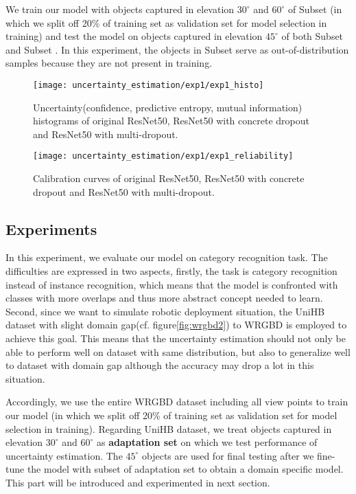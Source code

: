 We train our model with objects captured in elevation $30^\circ$ and $60^\circ$ of Subset  (in which we split off 20\% of training set as validation set for model selection in training) and test the model on objects captured in elevation $45^\circ$ of both Subset  and Subset . In this experiment, the objects in Subset  serve as out-of-distribution samples because they are not present in training.


\begin{figure}[H]
	\begin{center}
		\texttt{[image: uncertainty\_estimation/exp1/exp1\_histo]}
		\caption{Uncertainty(confidence, predictive entropy, mutual information) histograms of original ResNet50, ResNet50 with concrete dropout and ResNet50 with multi-dropout.}		
		\label{exp1_histo}
	\end{center}
\end{figure}
\begin{figure}[H]
	\begin{center}
		\texttt{[image: uncertainty\_estimation/exp1/exp1\_reliability]}
		\caption{Calibration curves of original ResNet50, ResNet50 with concrete dropout and ResNet50 with multi-dropout.}		
		\label{exp1_reliability}
	\end{center}
\end{figure}

\subsection{Experiments }
In this experiment, we evaluate our model on category recognition task. The difficulties are expressed in two aspects, firstly, the task is category recognition instead of instance recognition, which means that the model is confronted with classes with more overlaps and thus more abstract concept needed to learn. Second, since we want to simulate robotic deployment situation, the UniHB dataset with slight domain gap(cf. figure\ref{fig:wrgbd2}) to WRGBD is employed to achieve this goal. This means that the uncertainty estimation should not only be able to perform well on dataset with same distribution, but also to generalize well to dataset with domain gap although the accuracy may drop a lot in this situation.

Accordingly, we use the entire WRGBD dataset including all view points to train our model (in which we split off 20\% of training set as validation set for model selection in training). Regarding UniHB dataset, we treat objects captured in elevation $30^\circ$ and $60^\circ$ as \textbf{adaptation set} on which we test performance of uncertainty estimation. The $45^\circ$ objects are used for final testing after we fine-tune the model with subset of adaptation set to obtain a domain specific model. This part will be introduced and experimented in next section.

